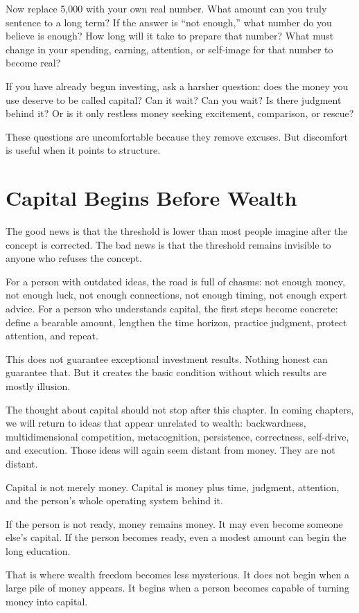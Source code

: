 Now replace 5,000 with your own real number. What amount can you truly sentence to a long term? If the answer is ``not enough,'' what number do you believe is enough? How long will it take to prepare that number? What must change in your spending, earning, attention, or self-image for that number to become real?

If you have already begun investing, ask a harsher question: does the money you use deserve to be called capital? Can it wait? Can you wait? Is there judgment behind it? Or is it only restless money seeking excitement, comparison, or rescue?

These questions are uncomfortable because they remove excuses. But discomfort is useful when it points to structure.

\section*{Capital Begins Before Wealth}

The good news is that the threshold is lower than most people imagine after the concept is corrected. The bad news is that the threshold remains invisible to anyone who refuses the concept.

For a person with outdated ideas, the road is full of chasms: not enough money, not enough luck, not enough connections, not enough timing, not enough expert advice. For a person who understands capital, the first steps become concrete: define a bearable amount, lengthen the time horizon, practice judgment, protect attention, and repeat.

This does not guarantee exceptional investment results. Nothing honest can guarantee that. But it creates the basic condition without which results are mostly illusion.

The thought about capital should not stop after this chapter. In coming chapters, we will return to ideas that appear unrelated to wealth: backwardness, multidimensional competition, metacognition, persistence, correctness, self-drive, and execution. Those ideas will again seem distant from money. They are not distant.

Capital is not merely money. Capital is money plus time, judgment, attention, and the person's whole operating system behind it.

If the person is not ready, money remains money. It may even become someone else's capital. If the person becomes ready, even a modest amount can begin the long education.

That is where wealth freedom becomes less mysterious. It does not begin when a large pile of money appears. It begins when a person becomes capable of turning money into capital.
